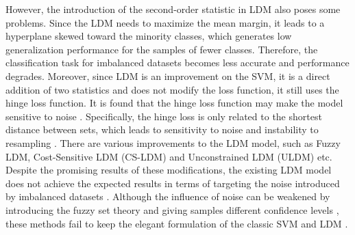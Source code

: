 \documentclass[a4paper]{cas-sc}
\begin{document}
However, the introduction of the second-order statistic in LDM also poses some problems. Since the LDM needs to maximize the mean margin, it leads to a hyperplane skewed toward the minority classes, which generates low generalization performance for the samples of fewer classes. Therefore, the classification task for imbalanced datasets becomes less accurate and performance degrades. Moreover, since LDM is an improvement on the SVM, it is a direct addition of two statistics and does not modify the loss function, it still uses the hinge loss function. It is found that the hinge loss function may make the model sensitive to noise \citep{huang2013support, 10323189, chen2024novel}. Specifically, the hinge loss is only related to the shortest distance between sets, which leads to sensitivity to noise and instability to resampling \citep{tanveer2021sparse}. There are various improvements to the LDM model, such as Fuzzy LDM, Cost-Sensitive LDM (CS-LDM) \citep{cheng2016cost} and Unconstrained LDM (ULDM) \citep{abe2017unconstrained} etc. Despite the promising results of these modifications, the existing LDM model does not achieve the expected results in terms of targeting the noise introduced by imbalanced datasets \citep{zhu2020support,yang2023optimal}. Although the influence of noise can be weakened by introducing the fuzzy set theory and giving samples different confidence levels \citep{chen2022fuzzy, liu2025novel}, these methods fail to keep the elegant formulation of the classic SVM and LDM \citep{huang2013support}.
\end{document}
